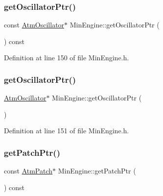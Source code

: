 \mbox{\label{class_min_engine_a29cf0e250614672a5619584db86c5618}} 
\subsubsection{\texorpdfstring{get\+Oscillator\+Ptr()}{getOscillatorPtr()}\hspace{0.1cm}{\footnotesize\ttfamily [1/2]}}
{\footnotesize\ttfamily const \hyperlink{class_atm_oscillator}{Atm\+Oscillator}$\ast$ Min\+Engine\+::get\+Oscillator\+Ptr (\begin{DoxyParamCaption}{ }\end{DoxyParamCaption}) const\hspace{0.3cm}{\ttfamily [inline]}}



Definition at line 150 of file Min\+Engine.\+h.

\mbox{\label{class_min_engine_ac1ffbd6265f3e251f447d866518e60ef}} 
\subsubsection{\texorpdfstring{get\+Oscillator\+Ptr()}{getOscillatorPtr()}\hspace{0.1cm}{\footnotesize\ttfamily [2/2]}}
{\footnotesize\ttfamily \hyperlink{class_atm_oscillator}{Atm\+Oscillator}$\ast$ Min\+Engine\+::get\+Oscillator\+Ptr (\begin{DoxyParamCaption}{ }\end{DoxyParamCaption})\hspace{0.3cm}{\ttfamily [inline]}}



Definition at line 151 of file Min\+Engine.\+h.

\mbox{\label{class_min_engine_a800de17fbe50c5f2aceab2999f3b8be1}} 
\subsubsection{\texorpdfstring{get\+Patch\+Ptr()}{getPatchPtr()}\hspace{0.1cm}{\footnotesize\ttfamily [1/2]}}
{\footnotesize\ttfamily const \hyperlink{class_atm_patch}{Atm\+Patch}$\ast$ Min\+Engine\+::get\+Patch\+Ptr (\begin{DoxyParamCaption}{ }\end{DoxyParamCaption}) const\hspace{0.3cm}{\ttfamily [inline]}}




